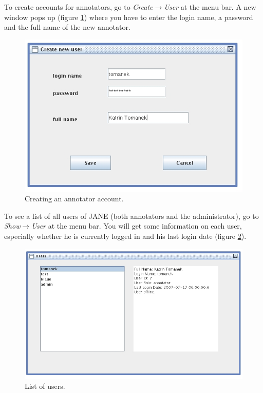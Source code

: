 \documentclass[DIV12,english,11pt,halfparskip]{scrartcl}
\begin{document}
To create accounts for annotators, go to
\emph{Create$\rightarrow$User} at the menu bar. A new window pops up
(figure \ref{fig:createuser}) where you have to enter the login name,
a password and the full name of the new annotator.

\begin{figure}[h]
  \centering
  \includegraphics[scale=0.5]{figs/CreateUser.jpg}
  \caption{Creating an annotator account.}
  \label{fig:createuser}
\end{figure}

To see a list of all users of JANE (both annotators and the
administrator), go to \emph{Show$\rightarrow$User} at the menu bar.
You will get some information on each user, especially whether he is
currently logged in and his last login date (figure
\ref{fig:showusers}).

\begin{figure}[h]
  \centering
  \includegraphics[scale=0.5]{figs/ShowUsersFrame.jpg}
  \caption{List of users.}
  \label{fig:showusers}
\end{figure}
\end{document}
